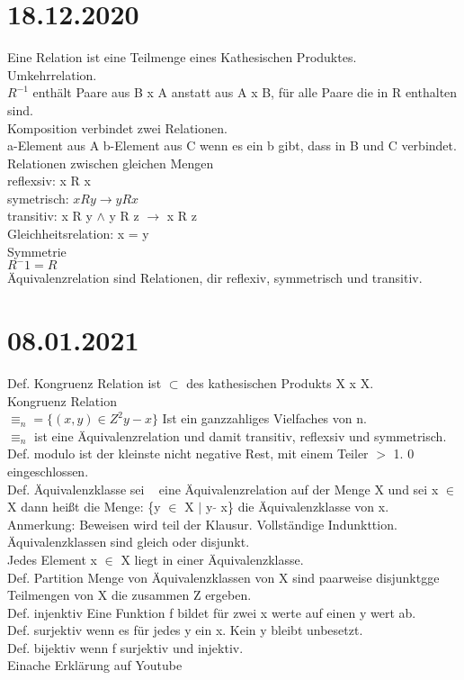 \documentclass{article}
\begin{document}
	\section*{18.12.2020}
	Eine Relation ist eine Teilmenge eines Kathesischen Produktes. \\
	Umkehrrelation. \\
	$R^{-1}$ enthält Paare aus B x A anstatt aus A x B, für alle Paare die in R enthalten sind. \\
	Komposition verbindet zwei Relationen. \\
	a-Element aus A b-Element aus C wenn es ein b gibt, dass in B und C verbindet. \\
	Relationen zwischen gleichen Mengen \\
	reflexsiv: x R x \\
	symetrisch: $x R y \to y R x$ \\
	transitiv: x R y $\land$ y R z $\to$ x R z \\
	Gleichheitsrelation: x = y \\
	Symmetrie \\
	$R^-1 = R$ \\
	Äquivalenzrelation sind Relationen, dir reflexiv, symmetrisch und transitiv.
	\section*{08.01.2021}
	Def. Kongruenz Relation ist $\subset$ des kathesischen Produkts X x X. \\
	Kongruenz Relation \\
	$\equiv_n = \{(x, y) \in Z^2 y -x\}$ Ist ein ganzzahliges Vielfaches von n. \\
	$\equiv_n$ ist eine Äquivalenzrelation und damit transitiv, reflexsiv und symmetrisch. \\
	Def. modulo ist der kleinste nicht negative Rest, mit einem Teiler $>$ 1. 0 eingeschlossen. \\
	Def. Äquivalenzklasse sei ~ eine Äquivalenzrelation auf der Menge X und sei x $\in$ X dann heißt die Menge: \{y $\in$ X $|$ y $\tilde{}$ x\} die Äquivalenzklasse von x. \\
	Anmerkung: Beweisen wird teil der Klausur. Vollständige Indunkttion. \\
	Äquivalenzklassen sind gleich oder disjunkt. \\
	Jedes Element x $\in$ X liegt in einer Äquivalenzklasse. \\
	Def. Partition Menge von Äquivalenzklassen von X sind paarweise disjunktgge Teilmengen von X die zusammen Z ergeben. \\
	Def. injenktiv Eine Funktion f bildet für zwei x werte auf einen y wert ab. \\
	Def. surjektiv wenn es für jedes y ein x. Kein y bleibt unbesetzt. \\
	Def. bijektiv wenn f surjektiv und injektiv. \\
	Einache Erklärung auf Youtube \\
\end{document}
